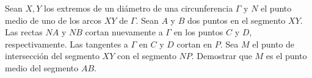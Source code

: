 Sean $X,Y$ los extremos de un diámetro de una circunferencia $\Gamma$ y $N$ el punto medio de uno de los arcos $XY$ de $\Gamma$. Sean $A$ y $B$ dos puntos en el segmento $XY$. Las rectas $NA$ y $NB$ cortan nuevamente a $\Gamma$ en los puntos $C$ y $D$, respectivamente. Las tangentes a $\Gamma$ en $C$ y $D$ cortan en $P$. Sea $M$ el punto de intersección del segmento $XY$ con el segmento $NP$. Demostrar que $M$ es el punto medio del segmento $AB$.
